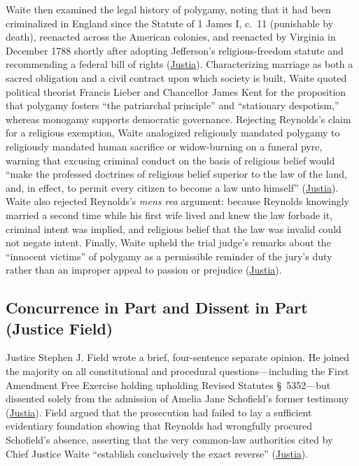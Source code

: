 \documentclass[12pt]{article}
\begin{document}
Waite then examined the legal history of polygamy, noting that it had been criminalized in England since the Statute of 1 James I, c.~11 (punishable by death), reenacted across the American colonies, and reenacted by Virginia in December 1788 shortly after adopting Jefferson's religious-freedom statute and recommending a federal bill of rights (\href{https://supreme.justia.com/cases/federal/us/98/145/}{Justia}). Characterizing marriage as both a sacred obligation and a civil contract upon which society is built, Waite quoted political theorist Francis Lieber and Chancellor James Kent for the proposition that polygamy fosters ``the patriarchal principle'' and ``stationary despotism,'' whereas monogamy supports democratic governance. Rejecting Reynolds's claim for a religious exemption, Waite analogized religiously mandated polygamy to religiously mandated human sacrifice or widow-burning on a funeral pyre, warning that excusing criminal conduct on the basis of religious belief would ``make the professed doctrines of religious belief superior to the law of the land, and, in effect, to permit every citizen to become a law unto himself'' (\href{https://supreme.justia.com/cases/federal/us/98/145/}{Justia}). Waite also rejected Reynolds's \textit{mens rea} argument: because Reynolds knowingly married a second time while his first wife lived and knew the law forbade it, criminal intent was implied, and religious belief that the law was invalid could not negate intent. Finally, Waite upheld the trial judge's remarks about the ``innocent victims'' of polygamy as a permissible reminder of the jury's duty rather than an improper appeal to passion or prejudice (\href{https://supreme.justia.com/cases/federal/us/98/145/}{Justia}).

\subsection{Concurrence in Part and Dissent in Part (Justice Field)}

Justice Stephen J. Field wrote a brief, four-sentence separate opinion. He joined the majority on all constitutional and procedural questions---including the First Amendment Free Exercise holding upholding Revised Statutes \S~5352---but dissented solely from the admission of Amelia Jane Schofield's former testimony (\href{https://supreme.justia.com/cases/federal/us/98/145/}{Justia}). Field argued that the prosecution had failed to lay a sufficient evidentiary foundation showing that Reynolds had wrongfully procured Schofield's absence, asserting that the very common-law authorities cited by Chief Justice Waite ``establish conclusively the exact reverse'' (\href{https://supreme.justia.com/cases/federal/us/98/145/}{Justia}).
\end{document}
